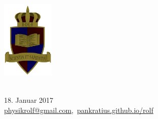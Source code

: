 \documentclass[a4paper]{article}
\begin{document}
	\vspace*{-2cm}
	\parbox{4cm}{\includegraphics[width=2.5cm]{../images/ROLF4.png}}
	\parbox{10.6cm}{ \\18. Januar 2017 \\ \href{mailto:physikrolf@gmail.com}{physikrolf@gmail.com},~\url{pankratius.github.io/rolf}\\ \vspace*{-.5cm} }
	
	

\thispagestyle{empty}

\noindent





\end{document}
